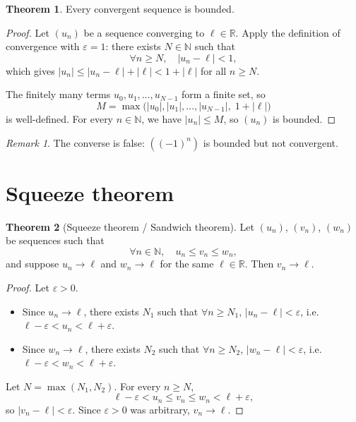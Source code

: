 \documentclass[12pt,a4paper,openany]{book}
\newcommand{\N}{\mathbb{N}}
\newcommand{\R}{\mathbb{R}}
\newcommand{\eps}{\varepsilon}
\newcommand{\abs}[1]{\left\lvert #1 \right\rvert}
\theoremstyle{definition}
\newtheorem{theorem}{Theorem}[chapter]
\theoremstyle{remark}
\newtheorem{remark}{Remark}[chapter]
\begin{document}
\begin{theorem}\label{thm:convergent-bounded}
Every convergent sequence is bounded.
\end{theorem}

\begin{proof}
Let $(u_n)$ be a sequence converging to $\ell \in \R$. Apply the definition of
convergence with $\eps = 1$: there exists $N \in \N$ such that
\[
   \forall n \geq N, \quad \abs{u_n - \ell} < 1,
\]
which gives $\abs{u_n} \leq \abs{u_n - \ell} + \abs{\ell} < 1 + \abs{\ell}$
for all $n \geq N$.

The finitely many terms $u_0, u_1, \ldots, u_{N-1}$ form a finite set, so
\[
   M = \max\!\bigl(\abs{u_0}, \abs{u_1}, \ldots, \abs{u_{N-1}},\; 1 + \abs{\ell}\bigr)
\]
is well-defined. For every $n \in \N$, we have $\abs{u_n} \leq M$, so
$(u_n)$ is bounded.
\end{proof}

\begin{remark}
The converse is false: $((-1)^n)$ is bounded but not convergent.
\end{remark}

\section{Squeeze theorem}\label{sec:squeeze}

\begin{theorem}[Squeeze theorem / Sandwich theorem]\label{thm:squeeze}
Let $(u_n)$, $(v_n)$, $(w_n)$ be sequences such that
\[
   \forall n \in \N, \quad u_n \leq v_n \leq w_n,
\]
and suppose $u_n \to \ell$ and $w_n \to \ell$ for the same $\ell \in \R$.
Then $v_n \to \ell$.
\end{theorem}

\begin{proof}
Let $\eps > 0$.
\begin{itemize}
\item Since $u_n \to \ell$, there exists $N_1$ such that
      $\forall n \geq N_1$, $\abs{u_n - \ell} < \eps$, i.e.\
      $\ell - \eps < u_n < \ell + \eps$.
\item Since $w_n \to \ell$, there exists $N_2$ such that
      $\forall n \geq N_2$, $\abs{w_n - \ell} < \eps$, i.e.\
      $\ell - \eps < w_n < \ell + \eps$.
\end{itemize}
Let $N = \max(N_1, N_2)$. For every $n \geq N$,
\[
   \ell - \eps < u_n \leq v_n \leq w_n < \ell + \eps,
\]
so $\abs{v_n - \ell} < \eps$. Since $\eps > 0$ was arbitrary, $v_n \to \ell$.
\end{proof}
\end{document}
